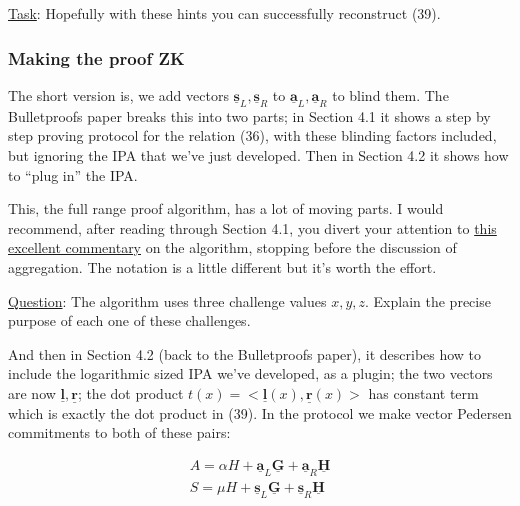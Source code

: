 \documentclass[10pt,a4paper]{article}
\begin{document}
\vspace{5 pt}

\underline{Task}: Hopefully with these hints you can successfully reconstruct (39).

\vspace{5 pt}


\subsubsection{Making the proof ZK}

The short version is, we add vectors $\underline{\textbf{s}}_L, \underline{\textbf{s}}_R$ to $\underline{\textbf{a}}_L, \underline{\textbf{a}}_R$ to blind them. The Bulletproofs paper breaks this into two parts; in Section 4.1 it shows a step by step proving protocol for the relation (36), with these blinding factors included, but ignoring the IPA that we've just developed. Then in Section 4.2 it shows how to ``plug in'' the IPA.

\vspace{5 pt}

This, the full range proof algorithm, has a lot of moving parts. I would recommend, after reading through Section 4.1, you divert your attention to \href{https://doc-internal.dalek.rs/bulletproofs/notes/range_proof/index.html}{this excellent commentary} on the algorithm, stopping before the discussion of aggregation. The notation is a little different but it's worth the effort.

\vspace{5 pt}

\underline{Question}: The algorithm uses three challenge values $x, y, z$. Explain the precise purpose of each one of these challenges.


\iffalse
And then in Section 4.2 (back to the Bulletproofs paper), it describes how to include the logarithmic sized IPA we've developed, as a plugin; the two vectors are now $\underline{\textbf{l}}, \underline{\textbf{r}}$; the dot product $t(x) = <\underline{\textbf{l}}(x), \underline{\textbf{r}}(x)>$ has constant term which is exactly the dot product in (39). In the protocol we make vector Pedersen commitments to both of these pairs:

\begin{align*}
A = \alpha H + \underline{\textbf{a}}_L \underline{\textbf{G}} + \underline{\textbf{a}}_R \underline{\textbf{H}} \\
S = \mu H + \underline{\textbf{s}}_L \underline{\textbf{G}} + \underline{\textbf{s}}_R \underline{\textbf{H}}
\end{align*}
\end{document}
